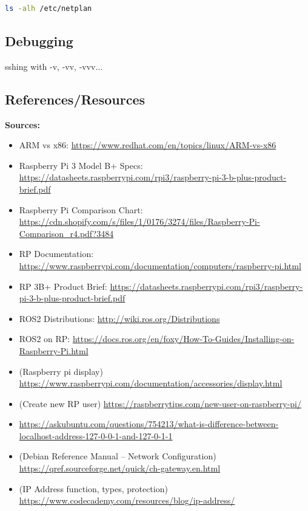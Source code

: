 \documentclass[a4paper, 10pt]{article}
\begin{document}
        \begin{lstlisting}[language=bash]
            ls -alh /etc/netplan
        \end{lstlisting}

    \subsection{Debugging}
    sshing with -v, -vv, -vvv...
    
    \subsection{References/Resources}
        \textbf{Sources:}
        \begin{itemize}
          \item ARM vs x86: 
          \url{https://www.redhat.com/en/topics/linux/ARM-vs-x86}
          \item Raspberry Pi 3 Model B+ Specs: \url{https://datasheets.raspberrypi.com/rpi3/raspberry-pi-3-b-plus-product-brief.pdf}
          \item Raspberry Pi Comparison Chart: \url{https://cdn.shopify.com/s/files/1/0176/3274/files/Raspberry-Pi-Comparison_r4.pdf?3484}
          \item RP Documentation: \url{https://www.raspberrypi.com/documentation/computers/raspberry-pi.html}
          \item RP 3B+ Product Brief:
          \url{https://datasheets.raspberrypi.com/rpi3/raspberry-pi-3-b-plus-product-brief.pdf}
          \item ROS2 Distributions: \url{http://wiki.ros.org/Distributions}
          \item ROS2 on RP: \url{https://docs.ros.org/en/foxy/How-To-Guides/Installing-on-Raspberry-Pi.html}
          \item (Raspberry pi display) \url{https://www.raspberrypi.com/documentation/accessories/display.html}
        \item (Create new RP user) \url{https://raspberrytips.com/new-user-on-raspberry-pi/}
        \item \url{https://askubuntu.com/questions/754213/what-is-difference-between-localhost-address-127-0-0-1-and-127-0-1-1}
        \item (Debian Reference Manual – Network Configuration) \url{https://qref.sourceforge.net/quick/ch-gateway.en.html}
        \item (IP Address function, types, protection) \url{https://www.codecademy.com/resources/blog/ip-address/}

\end{itemize}
\end{document}
